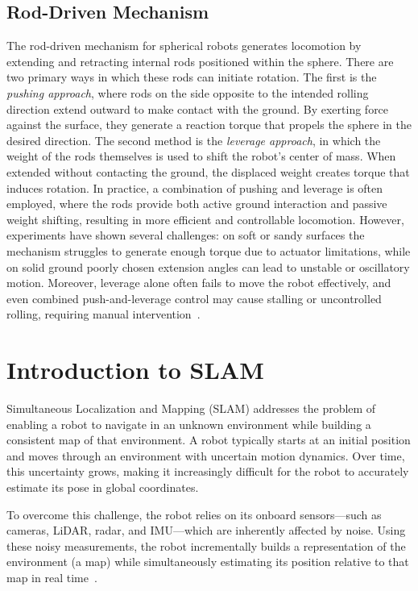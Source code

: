 \documentclass[english, bachelor, utf8]{base/thesis_telematics}
\begin{document}
\subsection{Rod-Driven Mechanism}
The rod-driven mechanism for spherical robots generates locomotion by extending and retracting internal rods positioned within the sphere. 
There are two primary ways in which these rods can initiate rotation. 
The first is the \textit{pushing approach}, where rods on the side opposite to the intended rolling direction extend outward to make contact with the ground. 
By exerting force against the surface, they generate a reaction torque that propels the sphere in the desired direction. 
The second method is the \textit{leverage approach}, in which the weight of the rods themselves is used to shift the robot’s center of mass. 
When extended without contacting the ground, the displaced weight creates torque that induces rotation. 
In practice, a combination of pushing and leverage is often employed, where the rods provide both active ground interaction and passive weight shifting, resulting in more efficient and controllable locomotion. 
However, experiments have shown several challenges: on soft or sandy surfaces the mechanism struggles to generate enough torque due to actuator limitations, while on solid ground poorly chosen extension angles can lead to unstable or oscillatory motion. 
Moreover, leverage alone often fails to move the robot effectively, and even combined push-and-leverage control may cause stalling or uncontrolled rolling, requiring manual intervention~\cite{rod_sphere}.



\section{Introduction to SLAM}
Simultaneous Localization and Mapping (SLAM) addresses the problem of enabling a robot to navigate in an unknown environment while building a consistent map of that environment.
A robot typically starts at an initial position and moves through an environment with uncertain motion dynamics. 
Over time, this uncertainty grows, making it increasingly difficult for the robot to accurately estimate its pose in global coordinates. 

To overcome this challenge, the robot relies on its onboard sensors---such as cameras, LiDAR, radar, and IMU---which are inherently affected by noise. 
Using these noisy measurements, the robot incrementally builds a representation of the environment (a map) while simultaneously estimating its position relative to that map in real time~\cite{slam_problem}. 
\end{document}
